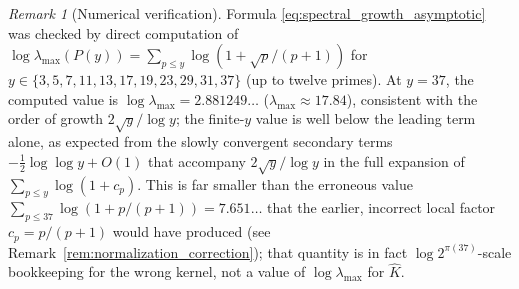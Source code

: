 \documentclass[11pt]{amsart}
\numberwithin{equation}{section}
\theoremstyle{plain}
\theoremstyle{definition}
\theoremstyle{remark}
\newtheorem{remark}[theorem]{Remark}
\begin{document}
\begin{remark}[Numerical verification]
\label{rem:spectral_growth_numeric}
Formula \eqref{eq:spectral_growth_asymptotic} was checked by direct computation of \(\log\lambda_{\max}(P(y))=\sum_{p\le y}\log(1+\sqrt p/(p+1))\) for \(y\in\{3,5,7,11,13,17,19,23,29,31,37\}\) (up to twelve primes).  At \(y=37\), the computed value is \(\log\lambda_{\max}=2.881249\ldots\) (\(\lambda_{\max}\approx17.84\)), consistent with the order of growth \(2\sqrt y/\log y\); the finite-\(y\) value is well below the leading term alone, as expected from the slowly convergent secondary terms \(-\tfrac12\log\log y+O(1)\) that accompany \(2\sqrt y/\log y\) in the full expansion of \(\sum_{p\le y}\log(1+c_p)\).  This is far smaller than the erroneous value \(\sum_{p\le37}\log(1+p/(p+1))=7.651\ldots\) that the earlier, incorrect local factor \(c_p=p/(p+1)\) would have produced (see Remark~\ref{rem:normalization_correction}); that quantity is in fact \(\log2^{\pi(37)}\)-scale bookkeeping for the wrong kernel, not a value of \(\log\lambda_{\max}\) for \(\widehat K\).
\end{remark}
\end{document}

